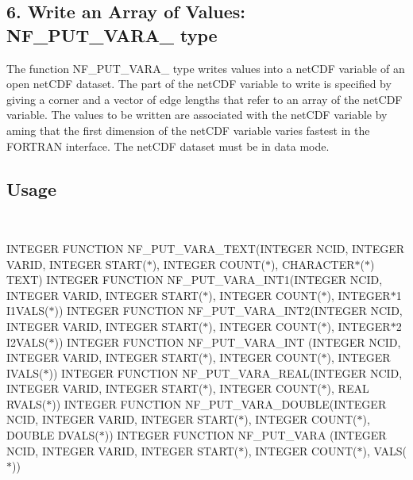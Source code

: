 \subsection*{6. Write an Array of Values\+: N\+F\+\_\+\+P\+U\+T\+\_\+\+V\+A\+R\+A\+\_\+ type }

The function N\+F\+\_\+\+P\+U\+T\+\_\+\+V\+A\+R\+A\+\_\+ type writes values into a net\+C\+DF variable of an open net\+C\+DF dataset. The part of the net\+C\+DF variable to write is specified by giving a corner and a vector of edge lengths that refer to an array of the net\+C\+DF variable. The values to be written are associated with the net\+C\+DF variable by aming that the first dimension of the net\+C\+DF variable varies fastest in the F\+O\+R\+T\+R\+AN interface. The net\+C\+DF dataset must be in data mode.

\subsection*{Usage }

 

I\+N\+T\+E\+G\+ER F\+U\+N\+C\+T\+I\+ON N\+F\+\_\+\+P\+U\+T\+\_\+\+V\+A\+R\+A\+\_\+\+T\+E\+XT(I\+N\+T\+E\+G\+ER N\+C\+ID, I\+N\+T\+E\+G\+ER V\+A\+R\+ID, I\+N\+T\+E\+G\+ER S\+T\+A\+R\+T($\ast$), I\+N\+T\+E\+G\+ER C\+O\+U\+N\+T($\ast$), C\+H\+A\+R\+A\+C\+T\+E\+R$\ast$($\ast$) T\+E\+XT) I\+N\+T\+E\+G\+ER F\+U\+N\+C\+T\+I\+ON N\+F\+\_\+\+P\+U\+T\+\_\+\+V\+A\+R\+A\+\_\+\+I\+N\+T1(I\+N\+T\+E\+G\+ER N\+C\+ID, I\+N\+T\+E\+G\+ER V\+A\+R\+ID, I\+N\+T\+E\+G\+ER S\+T\+A\+R\+T($\ast$), I\+N\+T\+E\+G\+ER C\+O\+U\+N\+T($\ast$), I\+N\+T\+E\+G\+E\+R$\ast$1 I1\+V\+A\+L\+S($\ast$)) I\+N\+T\+E\+G\+ER F\+U\+N\+C\+T\+I\+ON N\+F\+\_\+\+P\+U\+T\+\_\+\+V\+A\+R\+A\+\_\+\+I\+N\+T2(I\+N\+T\+E\+G\+ER N\+C\+ID, I\+N\+T\+E\+G\+ER V\+A\+R\+ID, I\+N\+T\+E\+G\+ER S\+T\+A\+R\+T($\ast$), I\+N\+T\+E\+G\+ER C\+O\+U\+N\+T($\ast$), I\+N\+T\+E\+G\+E\+R$\ast$2 I2\+V\+A\+L\+S($\ast$)) I\+N\+T\+E\+G\+ER F\+U\+N\+C\+T\+I\+ON N\+F\+\_\+\+P\+U\+T\+\_\+\+V\+A\+R\+A\+\_\+\+I\+NT (I\+N\+T\+E\+G\+ER N\+C\+ID, I\+N\+T\+E\+G\+ER V\+A\+R\+ID, I\+N\+T\+E\+G\+ER S\+T\+A\+R\+T($\ast$), I\+N\+T\+E\+G\+ER C\+O\+U\+N\+T($\ast$), I\+N\+T\+E\+G\+ER I\+V\+A\+L\+S($\ast$)) I\+N\+T\+E\+G\+ER F\+U\+N\+C\+T\+I\+ON N\+F\+\_\+\+P\+U\+T\+\_\+\+V\+A\+R\+A\+\_\+\+R\+E\+AL(I\+N\+T\+E\+G\+ER N\+C\+ID, I\+N\+T\+E\+G\+ER V\+A\+R\+ID, I\+N\+T\+E\+G\+ER S\+T\+A\+R\+T($\ast$), I\+N\+T\+E\+G\+ER C\+O\+U\+N\+T($\ast$), R\+E\+AL R\+V\+A\+L\+S($\ast$)) I\+N\+T\+E\+G\+ER F\+U\+N\+C\+T\+I\+ON N\+F\+\_\+\+P\+U\+T\+\_\+\+V\+A\+R\+A\+\_\+\+D\+O\+U\+B\+LE(I\+N\+T\+E\+G\+ER N\+C\+ID, I\+N\+T\+E\+G\+ER V\+A\+R\+ID, I\+N\+T\+E\+G\+ER S\+T\+A\+R\+T($\ast$), I\+N\+T\+E\+G\+ER C\+O\+U\+N\+T($\ast$), D\+O\+U\+B\+LE D\+V\+A\+L\+S($\ast$)) I\+N\+T\+E\+G\+ER F\+U\+N\+C\+T\+I\+ON N\+F\+\_\+\+P\+U\+T\+\_\+\+V\+A\+RA (I\+N\+T\+E\+G\+ER N\+C\+ID, I\+N\+T\+E\+G\+ER V\+A\+R\+ID, I\+N\+T\+E\+G\+ER S\+T\+A\+R\+T($\ast$), I\+N\+T\+E\+G\+ER C\+O\+U\+N\+T($\ast$), V\+A\+L\+S($\ast$))

